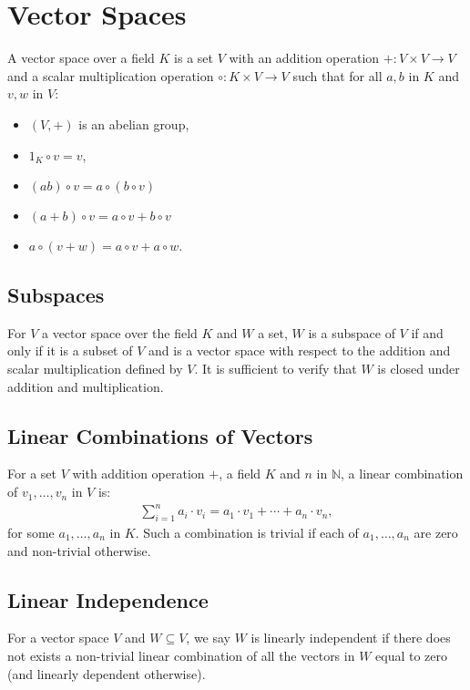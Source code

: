 \section{Vector Spaces}

A vector space over a field $K$ is a set $V$ with an addition
operation $+ : V \times V \to V$ and a scalar multiplication operation
$\circ : K \times V \to V$ such that for all $a, b$ in $K$
and $v, w$ in $V$: \begin{itemize}
  \item $(V, +)$ is an abelian group,
  \item $1_K \circ v = v$,
  \item $(ab) \circ v = a \circ (b \circ v)$
  \item $(a + b) \circ v = a \circ v + b \circ v$
  \item $a \circ (v + w) = a \circ v + a \circ w$.
\end{itemize}

\subsection{Subspaces}

For $V$ a vector space over the field $K$ and $W$ a set, $W$ is a 
subspace of $V$ if and only if it is a subset of $V$ and is a vector 
space with respect to the addition and scalar multiplication defined by $V$.
It is sufficient to verify that $W$ is closed under addition and multiplication.

\subsection{Linear Combinations of Vectors}

For a set $V$ with addition operation $+$, a field $K$ and $n$ in 
$\mathbb{N}$, a linear combination of $v_1, \ldots, v_n$ in $V$ is: 
\begin{gather*}
  \sum_{i = 1}^n a_i \cdot v_i = a_1 \cdot v_1 + \cdots + a_n \cdot v_n,
\end{gather*} for some $a_1, \ldots, a_n$ in $K$. Such a combination is
trivial if each of $a_1, \ldots, a_n$ are zero and non-trivial otherwise.

\subsection{Linear Independence}

For a vector space $V$ and $W \subseteq V$, we say $W$ is linearly independent 
if there does not exists a non-trivial linear combination of all the vectors in 
$W$ equal to zero (and linearly dependent otherwise).

